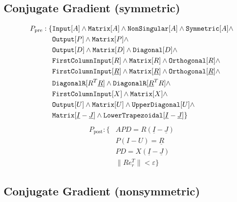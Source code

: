 \subsection{Conjugate Gradient (symmetric)}
%
\begin{align*}
P_\text{pre}: \{ &\text{\ttfamily Input}[A] \land \text{\ttfamily Matrix}[A] \land \text{\ttfamily NonSingular}[A] \land \text{\ttfamily Symmetric}[A] \land \\
		&\text{\ttfamily Output}[P] \land \text{\ttfamily Matrix}[P] \land \\
		&\text{\ttfamily Output}[D] \land \text{\ttfamily Matrix}[D] \land \text{\ttfamily Diagonal}[D] \land \\
		&\text{\ttfamily FirstColumnInput}[R] \land \text{\ttfamily Matrix}[R] \land \text{\ttfamily Orthogonal}[R] \land \\
		&\text{\ttfamily FirstColumnInput}[\underline{R}] \land \text{\ttfamily Matrix}[\underline{R}] \land \text{\ttfamily Orthogonal}[\underline{R}] \land \\
		&\text{\ttfamily DiagonalR}[R^T \underline{R}] \land \text{\ttfamily DiagonalR}[\underline{R}^T R] \land \\
		&\text{\ttfamily FirstColumnInput}[X] \land \text{\ttfamily Matrix}[X] \land \\
		&\text{\ttfamily Output}[U] \land \text{\ttfamily Matrix}[U] \land \text{\ttfamily UpperDiagonal}[U] \land \\
		& \text{\ttfamily Matrix}[\underline{I} - \underline{J}] \land \text{\ttfamily LowerTrapezoidal}[\underline{I} - \underline{J}] \}
\end{align*}
%
\begin{align*}
P_\text{post}:	\{ 	&APD = R \left( \underline{I} - \underline{J}  \right) \\
				&P \left( I - U \right) = \underline{R} \\
				&PD = X \left( \underline{I} - \underline{J} \right) \\
				&\| R e_r^T \| < \varepsilon \}
\end{align*}

\subsection{Conjugate Gradient (nonsymmetric)}

